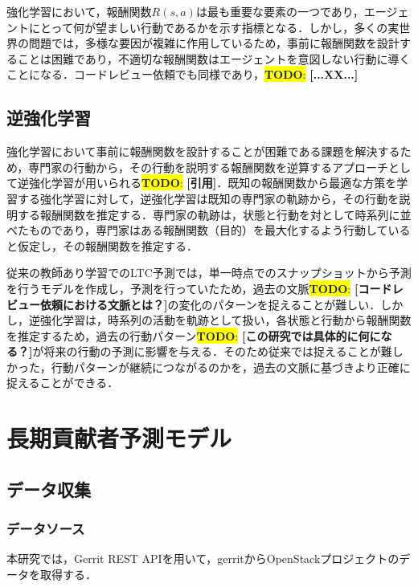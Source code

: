 \documentclass[submit,techrep,noauthor]{ipsj}
\newcommand{\todo}[1]{\colorbox{yellow}{{\bf TODO}:}{\color{red} {\textbf{[#1]}}}}
\begin{document}
強化学習において，報酬関数$R(s, a)$は最も重要な要素の一つであり，エージェントにとって何が望ましい行動であるかを示す指標となる．しかし，多くの実世界の問題では，多様な要因が複雑に作用しているため，事前に報酬関数を設計することは困難であり，不適切な報酬関数はエージェントを意図しない行動に導くことになる．コードレビュー依頼でも同様であり，\todo{...XX...}

\subsection{逆強化学習}
強化学習において事前に報酬関数を設計することが困難である課題を解決するため，専門家の行動から，その行動を説明する報酬関数を逆算するアプローチとして逆強化学習が用いられる\todo{引用}．既知の報酬関数から最適な方策を学習する強化学習に対して，逆強化学習は既知の専門家の軌跡から，その行動を説明する報酬関数を推定する．専門家の軌跡は，状態と行動を対として時系列に並べたものであり，専門家はある報酬関数（目的）を最大化するよう行動していると仮定し，その報酬関数を推定する．

従来の教師あり学習でのLTC予測では，単一時点でのスナップショットから予測を行うモデルを作成し，予測を行っていたため，過去の文脈\todo{コードレビュー依頼における文脈とは？}の変化のパターンを捉えることが難しい．しかし，逆強化学習は，時系列の活動を軌跡として扱い，各状態と行動から報酬関数を推定するため，過去の行動パターン\todo{この研究では具体的に何になる？}が将来の行動の予測に影響を与える．そのため従来では捉えることが難しかった，行動パターンが継続につながるのかを，過去の文脈に基づきより正確に捉えることができる．


\section{長期貢献者予測モデル}
\label{sec:model}
\subsection{データ収集}
\subsubsection{データソース}
本研究では，Gerrit REST APIを用いて，gerritからOpenStackプロジェクトのデータを取得する．
\end{document}

